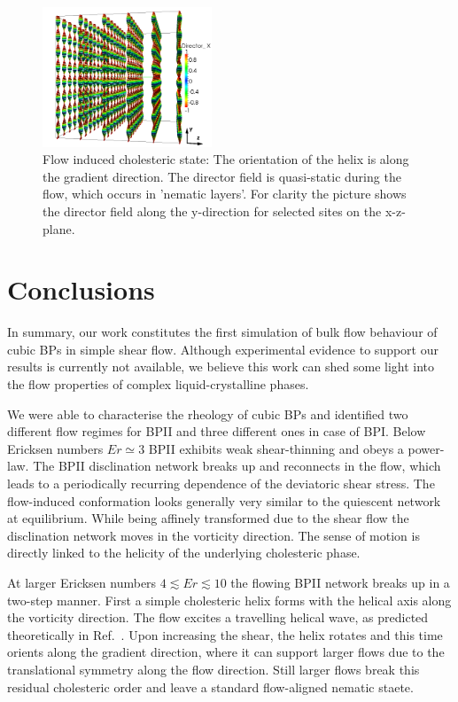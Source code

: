 \documentclass[aps,pre,reprint,superscriptaddress, twocolumn]{revtex4}
\begin{document}
\begin{figure}[htpb]
\includegraphics[width=0.45\textwidth]{dir3d+y-200k_run1179.png}
\caption{Flow induced cholesteric state: The orientation of the helix is 
along the gradient direction. The director field is quasi-static during 
the flow, which occurs in 'nematic layers'. For clarity the picture shows 
the director field along the y-direction for selected sites on the x-z-plane.}
\label{fig:cholflow}
\end{figure}




\section{Conclusions}

In summary, our work constitutes the first simulation of bulk flow behaviour 
of cubic BPs in simple shear flow. Although experimental evidence to support
our results is currently not available, we believe this work can shed some light 
into the flow properties of complex liquid-crystalline phases.
  
We were able to characterise the rheology of cubic BPs and identified 
two different flow regimes for BPII and three different ones in case of BPI. 
Below Ericksen numbers $Er\simeq3$ BPII exhibits weak shear-thinning and 
obeys a power-law.  The BPII disclination network breaks up and reconnects 
in the flow, which leads to a periodically recurring dependence 
of the deviatoric shear stress. The flow-induced conformation looks generally
very similar to the quiescent network at equilibrium. 
While being affinely transformed due to the shear flow
the disclination network moves in the vorticity direction. The sense of
motion is directly linked to the helicity of the underlying cholesteric phase.

At larger Ericksen numbers $4\lesssim Er\lesssim 10$ the flowing BPII network 
breaks up in a two-step manner. First a simple cholesteric helix forms with the helical axis 
along the vorticity direction. The flow excites a travelling helical wave,
as predicted theoretically in Ref.~\cite{Rey:1996a,Rey:1996b}.
Upon increasing the shear, the helix rotates and this time orients along the
gradient direction, where it can support larger flows due to the translational
symmetry along the flow direction. Still larger flows break this residual
cholesteric order and leave a standard flow-aligned nematic staete.
\end{document}
